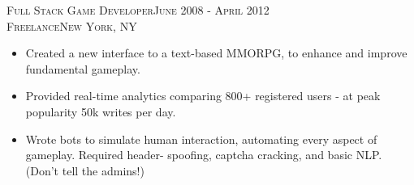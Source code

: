 \textsc{Full Stack Game Developer\hfill June 2008 - April 2012\\}
\textsc{Freelance\hfill New York, NY\\}
\begin{itemize}
	\setlength{\itemsep}{1pt}
	\setlength{\parskip}{0pt}
	\setlength{\parsep}{0pt}
	\setlength{\leftmargin}{-5mm}

    \item Created a new interface to a text-based MMORPG, to enhance and improve fundamental gameplay.
    \item Provided real-time analytics comparing 800+ registered users - at peak popularity 50k writes per day.
    \item Wrote bots to simulate human interaction, automating every aspect of gameplay. Required header-
            spoofing, captcha cracking, and basic NLP. (Don't tell the admins!)
\end{itemize}
